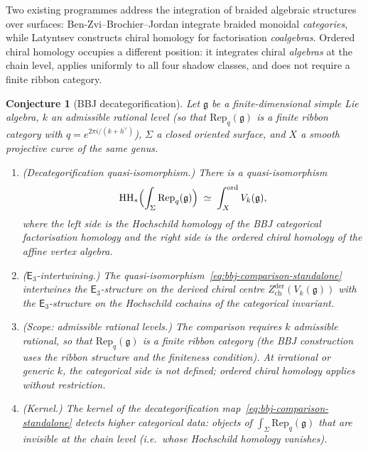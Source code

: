 \documentclass[11pt,reqno]{amsart}
\newtheorem{conjecture}[theorem]{Conjecture}
\theoremstyle{definition}
\theoremstyle{remark}
\newcommand{\HH}{\mathrm{HH}}
\newcommand{\Ethree}{\mathsf{E}_{3}}
\newcommand{\fg}{\mathfrak{g}}
\numberwithin{equation}{section}
\begin{document}
Two existing programmes address the integration of braided
algebraic structures over surfaces:
Ben-Zvi--Brochier--Jordan integrate braided monoidal
\emph{categories}, while Latyntsev constructs chiral
homology for factorisation \emph{coalgebras}. Ordered chiral
homology occupies a different position: it integrates chiral
\emph{algebras} at the chain level, applies uniformly to all
four shadow classes, and does not require a finite ribbon
category.

\begin{conjecture}[BBJ decategorification]
\label{conj:bbj-decategorification}
Let $\fg$ be a finite-dimensional simple Lie algebra,
$k$ an admissible rational level (so that
$\mathrm{Rep}_q(\fg)$ is a finite ribbon category with
$q = e^{2\pi i/(k + h^\vee)}$), $\Sigma$ a closed oriented
surface, and $X$ a smooth projective curve of the same genus.
\begin{enumerate}
\item[\textup{(i)}]
  \textup{(Decategorification quasi-isomorphism.)}
  There is a quasi-isomorphism
  \begin{equation}\label{eq:bbj-comparison-standalone}
    \HH_*\Bigl(\int_\Sigma \mathrm{Rep}_q(\fg)\Bigr)
    \;\simeq\;
    \int_X^{\mathrm{ord}} V_k(\fg),
  \end{equation}
  where the left side is the Hochschild homology of the
  BBJ categorical factorisation homology and the right
  side is the ordered chiral homology of the affine
  vertex algebra.
\item[\textup{(ii)}]
  \textup{($\Ethree$-intertwining.)}
  The quasi-isomorphism~\eqref{eq:bbj-comparison-standalone}
  intertwines the $\Ethree$-structure on the derived
  chiral centre
  $Z^{\mathrm{der}}_{\mathrm{ch}}(V_k(\fg))$ with the
  $\Ethree$-structure on the Hochschild cochains of the
  categorical invariant.
\item[\textup{(iii)}]
  \textup{(Scope: admissible rational levels.)}
  The comparison requires $k$ admissible rational, so that
  $\mathrm{Rep}_q(\fg)$ is a finite ribbon category
  (the BBJ construction uses the ribbon structure and
  the finiteness condition). At irrational or generic $k$,
  the categorical side is not defined; ordered chiral
  homology applies without restriction.
\item[\textup{(iv)}]
  \textup{(Kernel.)}
  The kernel of the decategorification
  map~\eqref{eq:bbj-comparison-standalone} detects higher
  categorical data: objects of
  $\int_\Sigma \mathrm{Rep}_q(\fg)$ that are invisible
  at the chain level (i.e.\ whose Hochschild homology
  vanishes).
\end{enumerate}
\end{conjecture}
\end{document}
